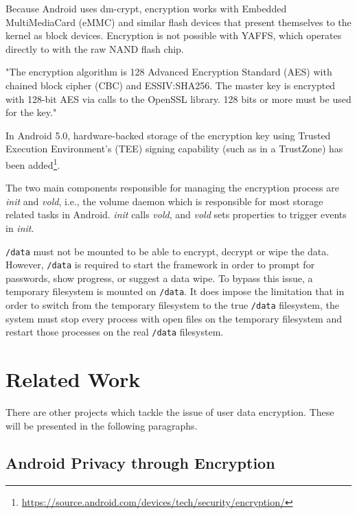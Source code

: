 Because Android uses dm-crypt, encryption works with Embedded MultiMediaCard (eMMC) and similar flash devices that present themselves to the kernel as block devices. Encryption is not possible with YAFFS, which operates directly to with the raw NAND flash chip.

"The encryption algorithm is 128 Advanced Encryption Standard (AES) with chained block cipher (CBC) and ESSIV:SHA256. The master key is encrypted with 128-bit AES via calls to the OpenSSL library. 128 bits or more must be used for the key\cite{andr-enc}."

In Android 5.0, hardware-backed storage of the encryption key using Trusted Execution Environment’s (TEE) signing capability (such as in a TrustZone) has been added\footnote{\url{https://source.android.com/devices/tech/security/encryption/}}.

The two main components responsible for managing the encryption process are \textit{init} and \textit{vold}, i.e., the volume daemon which is responsible for most storage related tasks in Android. \textit{init} calls \textit{vold}, and \textit{vold} sets properties to trigger events in \textit{init}.

\texttt{/data} must not be mounted to be able to encrypt, decrypt or wipe the data. However, \texttt{/data} is required to start the framework in order to prompt for passwords, show progress, or suggest a data wipe. To bypass this issue, a temporary filesystem is mounted on \texttt{/data}. It does impose the limitation that in order to switch from the temporary filesystem to the true \texttt{/data} filesystem, the system must stop every process with open files on the temporary filesystem and restart those processes on the real \texttt{/data} filesystem.

\section{Related Work}
\label{sec:related-work}

There are other projects which tackle the issue of user data encryption. These will be presented in the following paragraphs.

\subsection{Android Privacy through Encryption}
\label{sub-sec:and-priv-defreez}

